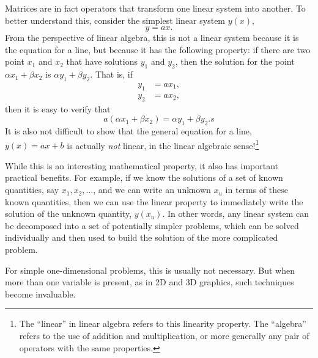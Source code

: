 \documentclass[letterpaper, 10pt]{report}
\begin{document}
Matrices are in fact operators that transform one linear system into another. To better understand this, consider the simplest linear system $y(x)$,
\begin{equation}
y = a x.
\end{equation}
From the perspective of linear algebra, this is not a linear system because it is the equation for a line, but because it has the following property: if there are two point $x_1$ and $x_2$ that have solutions $y_1$ and $y_2$, then the solution for the point $\alpha x_1 + \beta x_2$ is $\alpha y_1 + \beta y_2$. That is, if
\begin{align}
y_1 &= a x_1, \\
y_2 &= a x_2,
\end{align}
then it is easy to verify that
\begin{equation}
a \left( \alpha x_1 + \beta x_2 \right) = \alpha y_1 + \beta y_2.s
\end{equation}
It is also not difficult to show that the general equation for a line, $y(x) = a x + b$ is actually \emph{not} linear, in the linear algebraic sense!\footnote{The ``linear'' in linear algebra refers to this linearity property. The ``algebra'' refers to the use of addition and multiplication, or more generally any pair of operators with the same properties.}

While this is an interesting mathematical property, it also has important practical benefits. For example, if we know the solutions of a set of known quantities, say $x_1, x_2, \ldots$, and we can write an unknown $x_u$ in terms of these known quantities, then we can use the linear property to immediately write the solution of the unknown quantity, $y(x_u)$. In other words, any linear system can be decomposed into a set of potentially simpler problems, which can be solved individually and then used to build the solution of the more complicated problem.

For simple one-dimensional problems, this is usually not necessary. But when more than one variable is present, as in 2D and 3D graphics, such techniques become invaluable.

\end{document}
